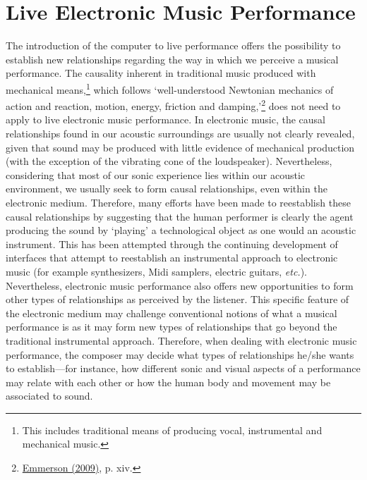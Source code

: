 \section{Live Electronic Music Performance}

The introduction of the computer to live performance offers the possibility to establish new relationships regarding the way in which we perceive a musical performance. The causality inherent in traditional music produced with mechanical means,\footnote{This includes traditional means of producing vocal, instrumental and mechanical music.} which follows `well-understood Newtonian mechanics of action and reaction, motion, energy, friction and damping,'\footnote{\hyperlink{emmersonliving}{Emmerson (2009)}, p. xiv.} does not need to apply to live electronic music performance. In electronic music, the causal relationships found in our acoustic surroundings are usually not clearly revealed, given that sound may be produced with little evidence of mechanical production (with the exception of the vibrating cone of the loudspeaker). Nevertheless, considering that most of our sonic experience lies within our acoustic environment, we usually seek to form causal relationships, even within the electronic medium. Therefore, many efforts have been made to reestablish these causal relationships by suggesting that the human performer is clearly the agent producing the sound by `playing' a technological object as one would an acoustic instrument. This has been attempted through the continuing development of interfaces that attempt to reestablish an instrumental approach to electronic music (for example synthesizers, Midi samplers, electric guitars, \emph{etc.}). Nevertheless, electronic music performance also offers new opportunities to form other types of relationships as perceived by the listener. This specific feature of the electronic medium may challenge conventional notions of what a musical performance is as it may form new types of relationships that go beyond the traditional instrumental approach. Therefore, when dealing with electronic music performance, the composer may decide what types of relationships he/she wants to establish---for instance, how different sonic and visual aspects of a performance may relate with each other or how the human body and movement may be associated to sound. 

